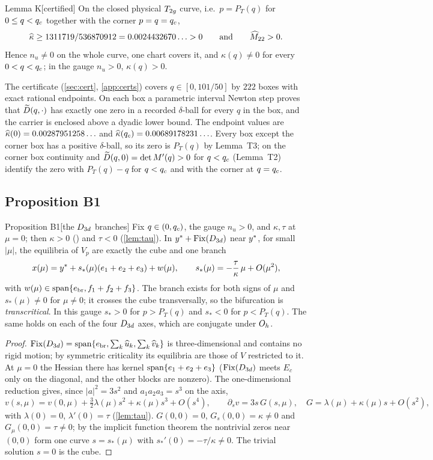 \begin{named}{Lemma K}[certified]\label{lem:K}
On the closed physical $T_{2g}$ curve, i.e.\ $p=P_T(q)$ for $0\le q<q_{c}$ together with the corner $p=q=q_{c}$,
\[
\widehat{\kappa}\ge 1311719/536870912=0.0024432670\ldots>0\qquad\text{and}\qquad \widehat{M}_{22}>0 .
\]
Hence $n_u\ne0$ on the whole curve, one chart covers it, and $\kappa(q)\ne0$ for every $0<q<q_{c}$; in the gauge
$n_u>0$, $\kappa(q)>0$.
\end{named}

The certificate (\cref{sec:cert}, \cref{app:certs}) covers $q\in[0,101/50]$ by $222$ boxes with exact rational
endpoints. On each box a parametric interval Newton step proves that $\widetilde{D}(q,\cdot)$ has exactly one zero in a recorded
$\delta$-ball for every $q$ in the box, and the carrier is enclosed above a dyadic lower bound. The endpoint values are
$\widehat{\kappa}(0)=0.00287951258\ldots$ and $\widehat{\kappa}(q_{c})=0.00689178231\ldots$. Every box except the corner box has a positive
$\delta$-ball, so its zero is $P_T(q)$ by Lemma~T3; on the corner box continuity and $\widetilde{D}(q,0)=\det M'(q)>0$ for $q<q_{c}$
(Lemma~T2) identify the zero with $P_T(q)-q$ for $q<q_{c}$ and with the corner at $q=q_{c}$.

\subsection{Proposition B1}

\begin{named}{Proposition B1}[the $D_{3d}$ branches]\label{prop:B1}
Fix $q\in(0,q_{c})$, the gauge $n_u>0$, and $\kappa,\tau$ at $\mu=0$; then $\kappa>0$ (\lemK) and $\tau<0$
(\cref{lem:tau}). In $y^{*}+\operatorname{Fix}(D_{3d})$ near $y^{*}$, for small $|\mu|$, the equilibria of $V_p$ are exactly the cube
and one branch
\[
x(\mu)=y^{*}+s_*(\mu)(e_1+e_2+e_3)+w(\mu),\qquad s_*(\mu)=-\frac{\tau}{\kappa}\,\mu+O(\mu^2),
\]
with $w(\mu)\in\operatorname{span}\{e_{\mathrm{br}},f_1+f_2+f_3\}$. The branch exists for both signs of $\mu$ and $s_*(\mu)\ne0$ for $\mu\ne0$; it
crosses the cube transversally, so the bifurcation is \emph{transcritical}. In this gauge $s_*>0$ for $p>P_T(q)$ and
$s_*<0$ for $p<P_T(q)$. The same holds on each of the four $D_{3d}$ axes, which are conjugate under $O_{h}$.
\end{named}

\begin{proof}
$\operatorname{Fix}(D_{3d})=\operatorname{span}\{e_{\mathrm{br}},\sum_k\widehat{u}_k,\sum_k\widehat{v}_k\}$ is three-dimensional and contains no rigid motion; by symmetric
criticality its equilibria are those of $V$ restricted to it. At $\mu=0$ the Hessian there has kernel
$\operatorname{span}\{e_1+e_2+e_3\}$ ($\operatorname{Fix}(D_{3d})$ meets $E_c$ only on the diagonal, and the other blocks are nonzero). The
one-dimensional reduction gives, since $|a|^2=3s^2$ and $a_1a_2a_3=s^3$ on the axis,
\[
v(s,\mu)=v(0,\mu)+\tfrac32\lambda(\mu)s^2+\kappa(\mu)s^3+O(s^4),\qquad \partial_sv=3s\,G(s,\mu),\quad G=\lambda(\mu)+\kappa(\mu)s+O(s^2),
\]
with $\lambda(0)=0$, $\lambda'(0)=\tau$ (\cref{lem:tau}). $G(0,0)=0$, $G_s(0,0)=\kappa\ne0$ and $G_\mu(0,0)=\tau\ne0$; by the
implicit function theorem the nontrivial zeros near $(0,0)$ form one curve $s=s_*(\mu)$ with $s_*'(0)=-\tau/\kappa\ne0$.
The trivial solution $s=0$ is the cube.
\end{proof}

